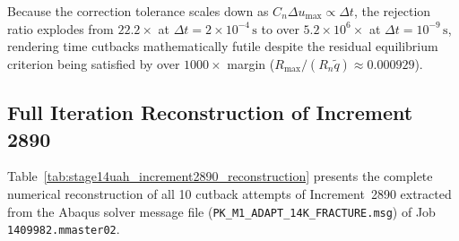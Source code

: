 Because the correction tolerance scales down as $C_n \Delta u_{\max} \propto \Delta t$, the rejection ratio explodes from $22.2\times$ at $\Delta t = 2\times 10^{-4}\,\mathrm{s}$ to over $5.2\times 10^6\times$ at $\Delta t = 10^{-9}\,\mathrm{s}$, rendering time cutbacks mathematically futile despite the residual equilibrium criterion being satisfied by over $1000\times$ margin ($R_{\max} / (R_n \tilde{q}) \approx 0.000929$).

\subsection{Full Iteration Reconstruction of Increment 2890}
\label{subsec:stage14uah_increment2890_reconstruction}

Table~\ref{tab:stage14uah_increment2890_reconstruction} presents the complete numerical reconstruction of all 10 cutback attempts of Increment~2890 extracted from the Abaqus solver message file (\texttt{PK\_M1\_ADAPT\_14K\_FRACTURE.msg}) of Job \texttt{1409982.mmaster02}.


